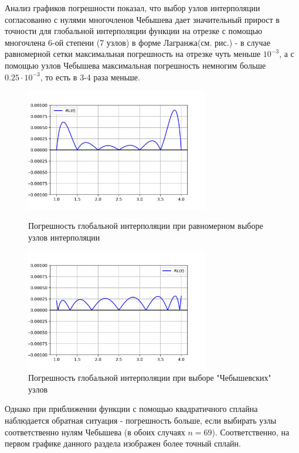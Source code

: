 Анализ графиков погрешности показал, что выбор узлов интерполяции согласованно с нулями многочленов Чебышева дает значительный прирост в точности для глобальной интерполяции функции на отрезке с помощью многочлена 6-ой степени (7 узлов) в форме Лагранжа(см. рис.) - в случае равномерной сетки максимальная погрешность на отрезке чуть меньше $10^{-3}$, а с помощью узлов Чебышева максимальная погрешность немногим больше $0.25 \cdot 10^{-3}$, то есть в 3-4 раза меньше.

\begin{figure}[h!]
	\centering                                                                                            
	\begin{minipage}{0.45\textwidth}
	        \centering
	        \includegraphics[width=8cm]{images/plot_4.2_err_Lagrange_equal.png} %
	        \caption{Погрешность глобальной интерполяции при равномерном выборе узлов интерполяции}
	\end{minipage}\hfill
	\begin{minipage}{0.45\textwidth}
		\centering
		\includegraphics[width=8cm]{images/plot_4.2_err_Lagrange_Chebyschev.png} %
		\caption{Погрешность глобальной интерполяции при выборе "Чебышевских" узлов}
	\end{minipage}
\end{figure}

Однако при приближении функции с помощью квадратичного сплайна наблюдается обратная ситуация - погрешность больше, если выбирать узлы соответственно нулям Чебышева (в обоих случаях $n = 69$). Соответственно, на первом графике данного раздела изображен более точный сплайн.

